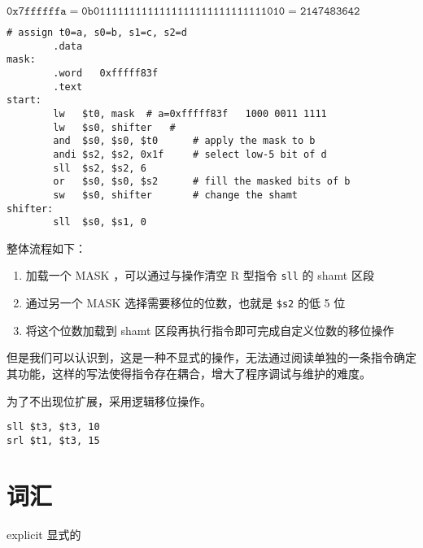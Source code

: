 \documentclass[lang=cn,11pt,a4paper,cite=authoryear]{elegantpaper}
\begin{document}


\(
\mathtt{0x7fff fffa} = \mathtt{0b 0111 1111 1111 1111 1111 1111 1111 1010} = \mathtt{2147483642}
\)



\begin{lstlisting}
# assign t0=a, s0=b, s1=c, s2=d
		.data
mask:	
		.word	0xfffff83f
		.text
start:	
		lw	 $t0, mask	# a=0xfffff83f   1000 0011 1111
		lw	 $s0, shifter	# 
		and  $s0, $s0, $t0      # apply the mask to b
		andi $s2, $s2, 0x1f     # select low-5 bit of d
		sll  $s2, $s2, 6        
		or   $s0, $s0, $s2      # fill the masked bits of b
		sw   $s0, shifter       # change the shamt
shifter:
		sll  $s0, $s1, 0 
\end{lstlisting}

整体流程如下：

\begin{enumerate}
    \item 加载一个 MASK ，可以通过与操作清空 R 型指令 \lstinline{sll} 的 shamt 区段
    \item 通过另一个 MASK 选择需要移位的位数，也就是 \lstinline{$s2} 的低 5 位
    \item 将这个位数加载到 shamt 区段再执行指令即可完成自定义位数的移位操作
\end{enumerate}

但是我们可以认识到，这是一种不显式的操作，无法通过阅读单独的一条指令确定其功能，这样的写法使得指令存在耦合，增大了程序调试与维护的难度。


为了不出现位扩展，采用逻辑移位操作。

\begin{lstlisting}
sll $t3, $t3, 10
srl $t1, $t3, 15
\end{lstlisting}    

\section*{词汇}

explicit 显式的





\end{document}
